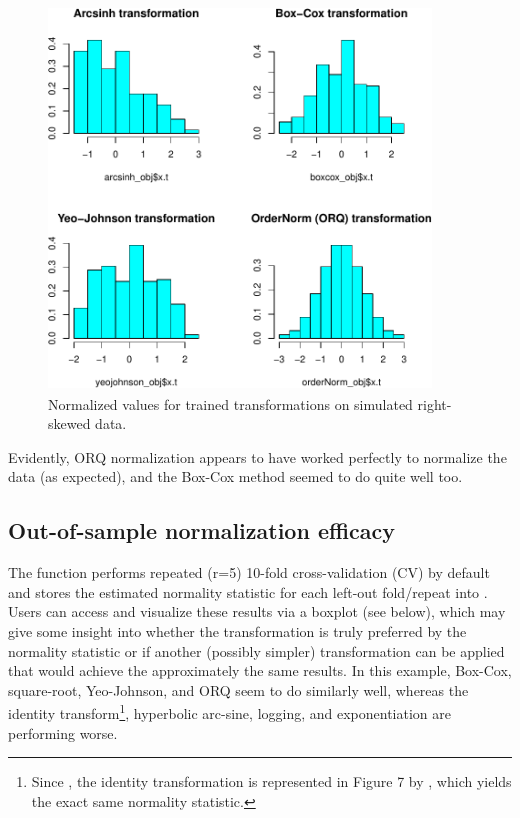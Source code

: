 \begin{Schunk}
\begin{figure}

{\centering \includegraphics[width=4in,height=4in]{figs/hist_trans-1} 

}

\caption[Normalized values for trained transformations on simulated right-skewed data]{Normalized values for trained transformations on simulated right-skewed data.}\label{fig:hist_trans}
\end{figure}
\end{Schunk}

Evidently, ORQ normalization appears to have worked perfectly to
normalize the data (as expected), and the Box-Cox method seemed to do
quite well too.

\hypertarget{out-of-sample-normalization-efficacy}{%
\subsection{Out-of-sample normalization
efficacy}\label{out-of-sample-normalization-efficacy}}

The  function performs repeated (r=5) 10-fold
cross-validation (CV) by default and stores the estimated normality
statistic for each left-out fold/repeat into
. Users can access and visualize these
results via a boxplot (see below), which may give some insight into
whether the transformation is truly preferred by the normality statistic
or if another (possibly simpler) transformation can be applied that
would achieve the approximately the same results. In this example,
Box-Cox, square-root, Yeo-Johnson, and ORQ seem to do similarly well,
whereas the identity
transform\footnote{Since , the identity transformation is represented in Figure 7 by , which yields the exact same normality statistic.},
hyperbolic arc-sine, logging, and exponentiation are performing worse.

